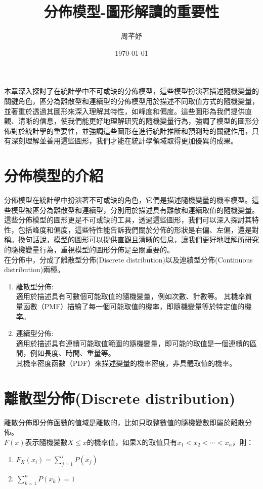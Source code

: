 \documentclass[12pt, a4paper]{article}
\title{分佈模型\;-\;圖形解讀的重要性}
\author{{\SM 周芊妤}}
\date{{\TT \today}}
\begin{document}
\maketitle
\fontsize{12}{22 pt}\selectfont

本章深入探討了在統計學中不可或缺的分佈模型，這些模型扮演著描述隨機變量的關鍵角色，區分為離散型和連續型的分佈模型用於描述不同取值方式的隨機變量，並著重於透過其圖形來深入理解其特性，如峰度和偏度。這些圖形為我們提供直觀、清晰的信息，使我們能更好地理解研究的隨機變量行為，強調了模型的圖形分佈對於統計學的重要性，並強調這些圖形在進行統計推斷和預測時的關鍵作用，只有深刻理解並善用這些圖形，我們才能在統計學領域取得更加優異的成果。

\section{分佈模型的介紹}
分佈模型在統計學中扮演著不可或缺的角色，它們是描述隨機變量的機率模型。這些模型被區分為離散型和連續型，分別用於描述具有離散和連續取值的隨機變量。這些分佈模型的圖形更是不可或缺的工具，透過這些圖形，我們可以深入探討其特性，包括峰度和偏度，這些特性能告訴我們關於分佈的形狀是右偏、左偏，還是對稱。換句話說，模型的圖形可以提供直觀且清晰的信息，讓我們更好地理解所研究的隨機變量行為，重視模型的圖形分佈是至關重要的。\\
在分佈中，分成了離散型分佈(Discrete distribution)以及連續型分佈(Continuous distribution)兩種。
\begin{enumerate}
\item 離散型分佈\;:\\
適用於描述具有可數個可能取值的隨機變量，例如次數、計數等。
其機率質量函數（PMF）描繪了每一個可能取值的機率，即隨機變量等於特定值的機率。
\item 連續型分佈\;:\\
適用於描述具有連續可能取值範圍的隨機變量，即可能的取值是一個連續的區間，例如長度、時間、重量等。\\
其機率密度函數（PDF）來描述變量的機率密度，非具體取值的機率。
\end{enumerate}

\section{離散型分佈(Discrete distribution)}
離散分佈即分佈函數的值域是離散的，比如只取整數值的隨機變數即屬於離散分佈。\\
$F(x)$\;表示隨機變數\;$X\leq x$\;的機率值，如果X的取值只有\;$x_{1}<x_{2}<\cdots<x_{n}$\;，則：
\begin{enumerate}
\item $F_{X}(x_{i})=\sum _{j=1}^{i}P(x_{j})$
\item $\sum _{k=1}^{n}P(x_{k})=1$
\end{enumerate}
\end{document}
